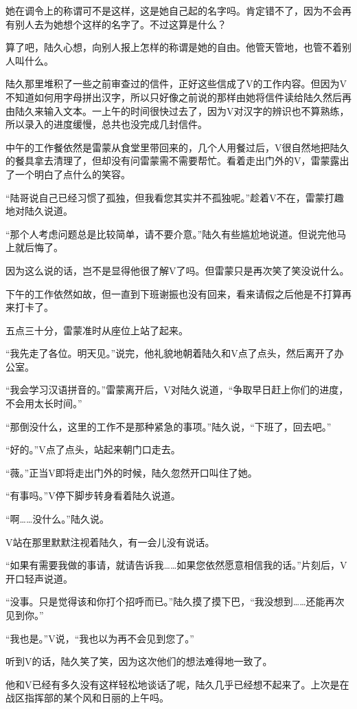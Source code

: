 她在调令上的称谓可不是这样，这是她自己起的名字吗。肯定错不了，因为不会再有别人去为她想个这样的名字了。不过这算是什么？

算了吧，陆久心想，向别人报上怎样的称谓是她的自由。他管天管地，也管不着别人叫什么。

陆久那里堆积了一些之前审查过的信件，正好这些信成了V的工作内容。但因为V不知道如何用字母拼出汉字，所以只好像之前说的那样由她将信件读给陆久然后再由陆久来输入文本。一上午的时间很快过去了，因为V对汉字的辨识也不算熟练，所以录入的进度缓慢，总共也没完成几封信件。

中午的工作餐依然是雷蒙从食堂里带回来的，几个人用餐过后，V很自然地把陆久的餐具拿去清理了，但却没有问雷蒙需不需要帮忙。看着走出门外的V，雷蒙露出了一个明白了点什么的笑容。

“陆哥说自己已经习惯了孤独，但我看您其实并不孤独呢。”趁着V不在，雷蒙打趣地对陆久说道。

“那个人考虑问题总是比较简单，请不要介意。”陆久有些尴尬地说道。但说完他马上就后悔了。

因为这么说的话，岂不是显得他很了解V了吗。但雷蒙只是再次笑了笑没说什么。

下午的工作依然如故，但一直到下班谢振也没有回来，看来请假之后他是不打算再来打卡了。

五点三十分，雷蒙准时从座位上站了起来。

“我先走了各位。明天见。”说完，他礼貌地朝着陆久和V点了点头，然后离开了办公室。

“我会学习汉语拼音的。”雷蒙离开后，V对陆久说道，“争取早日赶上你们的进度，不会用太长时间。”

“那倒没什么，这里的工作不是那种紧急的事项。”陆久说，“下班了，回去吧。”

“好的。”V点了点头，站起来朝门口走去。

“薇。”正当V即将走出门外的时候，陆久忽然开口叫住了她。

“有事吗。”V停下脚步转身看着陆久说道。

“啊……没什么。”陆久说。

V站在那里默默注视着陆久，有一会儿没有说话。

“如果有需要我做的事请，就请告诉我……如果您依然愿意相信我的话。”片刻后，V开口轻声说道。

“没事。只是觉得该和你打个招呼而已。”陆久摸了摸下巴，“我没想到……还能再次见到你。”

“我也是。”V说，“我也以为再不会见到您了。”

听到V的话，陆久笑了笑，因为这次他们的想法难得地一致了。

他和V已经有多久没有这样轻松地谈话了呢，陆久几乎已经想不起来了。上次是在战区指挥部的某个风和日丽的上午吗。

